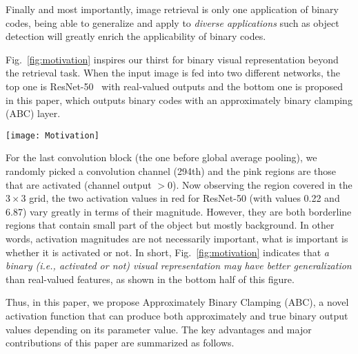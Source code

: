 \documentclass[runningheads]{llncs}
\newcommand{\ie}{\textit{i}.\textit{e}.}
\begin{document}
Finally and most importantly, image retrieval is only one application of binary codes, being able to generalize and apply to \emph{diverse applications} such as object detection will greatly enrich the applicability of binary codes.

Fig.~\ref{fig:motivation} inspires our thirst for binary visual representation beyond the retrieval task. When the input image is fed into two different networks, the top one is ResNet-50~\cite{ResNet} with real-valued outputs and the bottom one is proposed in this paper, which outputs binary codes with an approximately binary clamping (ABC) layer.
\begin{figure*}[t]
	\centering
	\texttt{[image: Motivation]}
	\caption{Binary codes (bottom half, produced by the proposed method) \emph{may} achieve better generalization ability than real-valued activation values (top half, produced by ResNet-50), whose magnitudes may be misleading.} \label{fig:motivation}
\end{figure*}

For the last convolution block (the one before global average pooling), we randomly picked a convolution channel (294th) and the pink regions are those that are activated (channel output $>0$). Now observing the region covered in the $3 \times 3$ grid, the two activation values in red for ResNet-50 (with values 0.22 and 6.87) vary greatly in terms of their magnitude. However, they are both borderline regions that contain small part of the object but mostly background. In other words, activation magnitudes are not necessarily important, what is important is whether it is activated or not. In short, Fig.~\ref{fig:motivation} indicates that \emph{a binary (\ie, activated or not) visual representation may have better generalization} than real-valued features, as shown in the bottom half of this figure.

Thus, in this paper, we propose Approximately Binary Clamping (ABC), a novel activation function that can produce both approximately and true binary output values depending on its parameter value. The key advantages and major contributions of this paper are summarized as follows.
\end{document}
